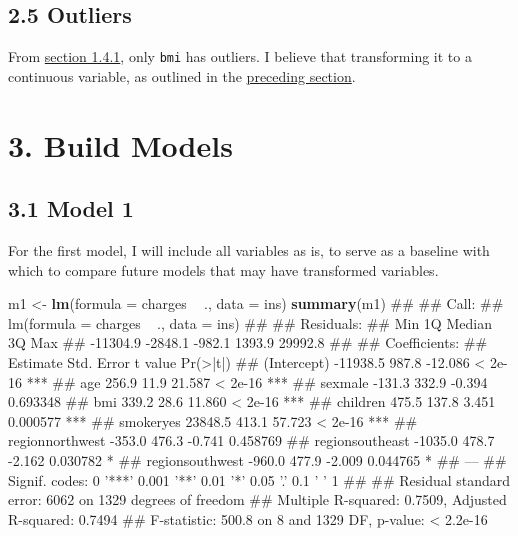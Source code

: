 \documentclass[]{article}
\newenvironment{Shaded}{\begin{snugshade}}{\end{snugshade}}
\newcommand{\KeywordTok}[1]{\textcolor[rgb]{0.13,0.29,0.53}{\textbf{#1}}}
\newcommand{\DataTypeTok}[1]{\textcolor[rgb]{0.13,0.29,0.53}{#1}}
\newcommand{\StringTok}[1]{\textcolor[rgb]{0.31,0.60,0.02}{#1}}
\newcommand{\OperatorTok}[1]{\textcolor[rgb]{0.81,0.36,0.00}{\textbf{#1}}}
\newcommand{\NormalTok}[1]{#1}
\begin{document}
\subsection{2.5 Outliers}\label{outliers}

From \protect\hyperlink{boxplot}{section 1.4.1}, only \texttt{bmi} has
outliers. I believe that transforming it to a continuous variable, as
outlined in the \protect\hyperlink{variable-transformation}{preceding
section}.

\section{3. Build Models}\label{build-models}

\subsection{3.1 Model 1}\label{model-1}

For the first model, I will include all variables as is, to serve as a
baseline with which to compare future models that may have transformed
variables.

\begin{Shaded}
\begin{Highlighting}[]
\NormalTok{m1 <-}\StringTok{ }\KeywordTok{lm}\NormalTok{(}\DataTypeTok{formula =}\NormalTok{ charges }\OperatorTok{~}\StringTok{ }\NormalTok{.,}
         \DataTypeTok{data =}\NormalTok{ ins)}
\KeywordTok{summary}\NormalTok{(m1)}
\NormalTok{## }
\NormalTok{## Call:}
\NormalTok{## lm(formula = charges ~ ., data = ins)}
\NormalTok{## }
\NormalTok{## Residuals:}
\NormalTok{##      Min       1Q   Median       3Q      Max }
\NormalTok{## -11304.9  -2848.1   -982.1   1393.9  29992.8 }
\NormalTok{## }
\NormalTok{## Coefficients:}
\NormalTok{##                 Estimate Std. Error t value Pr(>|t|)    }
\NormalTok{## (Intercept)     -11938.5      987.8 -12.086  < 2e-16 ***}
\NormalTok{## age                256.9       11.9  21.587  < 2e-16 ***}
\NormalTok{## sexmale           -131.3      332.9  -0.394 0.693348    }
\NormalTok{## bmi                339.2       28.6  11.860  < 2e-16 ***}
\NormalTok{## children           475.5      137.8   3.451 0.000577 ***}
\NormalTok{## smokeryes        23848.5      413.1  57.723  < 2e-16 ***}
\NormalTok{## regionnorthwest   -353.0      476.3  -0.741 0.458769    }
\NormalTok{## regionsoutheast  -1035.0      478.7  -2.162 0.030782 *  }
\NormalTok{## regionsouthwest   -960.0      477.9  -2.009 0.044765 *  }
\NormalTok{## ---}
\NormalTok{## Signif. codes:  0 '***' 0.001 '**' 0.01 '*' 0.05 '.' 0.1 ' ' 1}
\NormalTok{## }
\NormalTok{## Residual standard error: 6062 on 1329 degrees of freedom}
\NormalTok{## Multiple R-squared:  0.7509, Adjusted R-squared:  0.7494 }
\NormalTok{## F-statistic: 500.8 on 8 and 1329 DF,  p-value: < 2.2e-16}
\end{Highlighting}
\end{Shaded}
\end{document}

